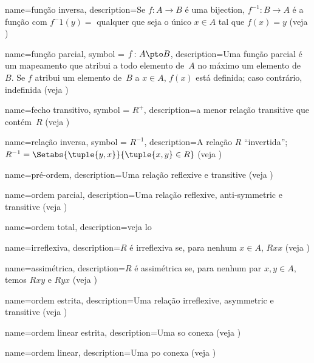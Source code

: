  {
  name=função inversa,
  description={Se $f\colon A \to B$ é uma \gls{bijection}, $f^{-1} \colon
    B \to A$ é a função com $f^-1(y) =$ qualquer que seja o único $x \in
    A$ tal que $f(x) = y$ (veja )} }

 {
  name=função parcial,
    symbol = {\ensuremath{f \colon A \pto B}},
  description={Uma função parcial é um mapeamento que atribui a todo
    {elemento} de~$A$ no máximo um {elemento} de~$B$. Se $f$ atribui
    um elemento de~$B$ a $x \in A$, $f(x)$ está definida; caso contrário,
    indefinida (veja )} }

 {
  name=fecho transitivo,
  symbol = {\ensuremath{R^+}},
  description={a menor relação \gls{transitive} que contém~$R$
    (veja )} }

 {
  name=relação inversa,
  symbol = {\ensuremath{R^{-1}}},  
  description={A relação $R$ ``invertida''; $R^{-1} =
    \Setabs{\tuple{y, x}}{\tuple{x, y} \in R}$ (veja
    )} }

 {
  name=pré-ordem,
  description={Uma relação \gls{reflexive} e \gls{transitive} (veja
    )} }

 {
  name=ordem parcial,
  description={Uma relação \gls{reflexive}, \gls{anti-symmetric} e
    \gls{transitive} (veja )} }

 {
  name=ordem total,
  description={veja \gls{lo}}}

 {
  name=irreflexiva,
  description={$R$ é irreflexiva se, para nenhum $x \in A$, $Rxx$ (veja
    )} }

 {
  name=assimétrica,
  description={$R$ é assimétrica se, para nenhum par $x,y\in A$, temos
    $Rxy$ e $Ryx$ (veja )} }

 {
  name=ordem estrita,
  description={Uma relação \gls{irreflexive}, \gls{asymmetric} e
    \gls{transitive} (veja )} }

 {
  name=ordem linear estrita,
  description={Uma \gls{so} conexa (veja
    )} }

 {
  name=ordem linear,
  description={Uma \gls{po} conexa (veja
    )} }

